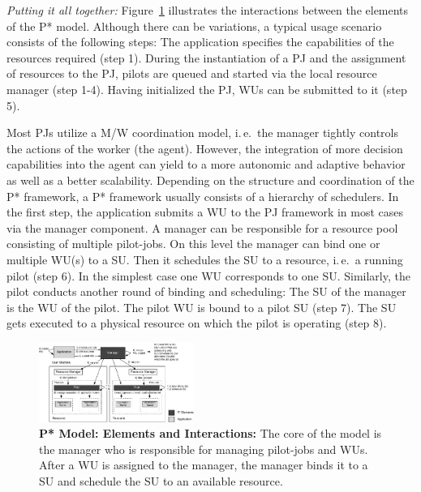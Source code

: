 \documentclass[conference,final]{IEEEtran}
\newcommand{\jhanote}[1]{ {\textcolor{red} { ***shantenu: #1 }}}
\newcommand{\alnote}[1]{ {\textcolor{blue} { ***andre: #1 }}}
\newcommand{\msnote}[1]{ {\textcolor{cyan} { ***mark: #1 }}}
\newcommand{\alnote}[1]{}
\newcommand{\jhanote}[1]{}
\newcommand{\msnote}[1]{}
\newcommand{\up}{\vspace*{-1em}}
\newcommand{\upp}{\vspace*{-0.5em}}
\begin{document}



{\it Putting it all together:} Figure~\ref{fig:figures_pstar}
illustrates the interactions between the elements of the P*
model. Although there can be variations, a typical usage scenario
consists of the following steps: The application specifies the
capabilities of the resources required (step 1). During the
instantiation of a PJ and the assignment of resources to the PJ,
pilots are queued and started via the local resource manager (step
1-4). Having initialized the PJ, WUs can be submitted to it (step 5).


Most PJs utilize a M/W coordination model, i.\,e.\ the manager tightly controls
the actions of the worker (the agent). However, the integration of more decision
capabilities into the agent can yield to a more autonomic and adaptive behavior
as well as a better scalability. Depending on the structure and coordination of
the P* framework, a P* framework usually consists of a hierarchy of schedulers.
In the first step, the application submits a WU to the PJ framework in most
cases via the manager component. A manager can be responsible for a resource
pool consisting of multiple pilot-jobs. On this level the manager can bind one
or multiple WU(s) to a SU. Then it schedules the SU to a resource, i.\,e.\ a 
running pilot (step 6). In the simplest case one WU corresponds to one SU. 
Similarly, the pilot conducts another round of binding and scheduling: The SU of 
the manager is the WU of the pilot. The pilot WU is bound to a pilot SU (step 
7). The SU gets executed to a physical resource on which the pilot is operating 
(step 8).

\begin{figure}[htbp]
    \centering\up
    \includegraphics[width=0.45\textwidth]{figures/pstar_model_multi.pdf}
    \caption{
      \textbf{P* Model: Elements and Interactions:} The core of
      the model is the manager who is responsible for managing
      pilot-jobs and WUs. After a WU is assigned to the manager, the manager
      binds it to a SU and schedule the SU to an available
      resource. %
      \upp\upp}
    \label{fig:figures_pstar}
\end{figure}
\end{document}
